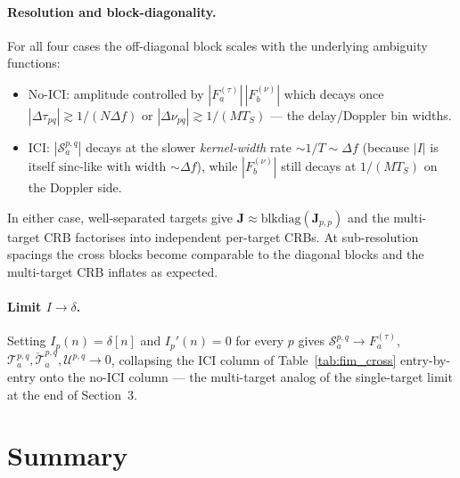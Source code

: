 \documentclass[11pt]{article}
\begin{document}
\paragraph{Resolution and block-diagonality.} For all four cases the
off-diagonal block scales with the underlying ambiguity functions:
\begin{itemize}
    \item No-ICI: amplitude controlled by
          \(|F_a^{(\tau)}|\,|F_b^{(\nu)}|\) which decays once
          \(|\Delta\tau_{pq}|\gtrsim 1/(N\Delta f)\) or
          \(|\Delta\nu_{pq}|\gtrsim 1/(MT_S)\) --- the delay/Doppler
          bin widths.
    \item ICI: \(|\mathcal{S}_a^{p,q}|\) decays at the slower
          \emph{kernel-width} rate \(\sim 1/T \sim \Delta f\)
          (because \(|I|\) is itself
          \(\mathrm{sinc}\)-like with width \(\sim\Delta f\)), while
          \(|F_b^{(\nu)}|\) still decays at \(1/(MT_S)\) on the
          Doppler side.
\end{itemize}
In either case, well-separated targets give
\(\bm{J}\approx\mathrm{blkdiag}(\bm{J}_{p,p})\) and the multi-target
CRB factorises into independent per-target CRBs. At sub-resolution
spacings the cross blocks become comparable to the diagonal blocks
and the multi-target CRB inflates as expected.

\paragraph{Limit \(I\to\delta\).} Setting
\(I_p(n)=\delta[n]\) and \(I_p'(n)=0\) for every \(p\) gives
\(\mathcal{S}_a^{p,q}\to F_a^{(\tau)}\),
\(\mathcal{T}_a^{p,q},\check{\mathcal{T}}_a^{p,q},\mathcal{U}^{p,q}\to 0\),
collapsing the ICI column of Table~\ref{tab:fim_cross} entry-by-entry
onto the no-ICI column --- the multi-target analog of the single-target
limit at the end of Section~3.

\section{Summary}
\end{document}
